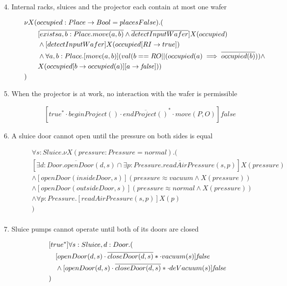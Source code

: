\begin{description}
\cbstart
 \item[4. Internal racks, sluices and the projector each contain at most one wafer]
\begin{align*}
& \nu X(occupied:Place \to Bool=placesFalse).(\\
& \tab\tab [\overline{exists a,b:Place.move(a,b)} \wedge \overline{detectInputWafer}]X(occupied) \\
& \tab\tab \wedge [detectInputWafer]X(occupied[RI \to true]) \\
& \tab\tab \wedge \forall a,b:Place.[move(a,b)](val(b==RO || (occupied(a) \implies \overline{occupied(b)})) \wedge \\
& \tab\tab X(occupied[b \to occupied(a)][a \to \mathit{false}])) \\
& )
\end{align*}
\cbend
 
 \item[5. When the projector is at work, no interaction with the wafer is permissible]
 	\begin{align*}
 		&[true^* \cdot beginProject() \cdot \overline{endProject()}^* \cdot move(P,O)]\mathit{false}
	\end{align*}
	
\cbstart
 \item[6. A sluice door cannot open until the pressure on both sides is equal]
	\begin{align*}
& \forall s: Sluice . \nu X(pressure: Pressure = normal) . ( \\
&   [\overline{\exists d: Door . openDoor(d, s)} \cap \overline{\exists p: Pressure . readAirPressure(s, p)}]X(pressure) \\
&   \wedge [openDoor(insideDoor, s)](pressure \approx vacuum \wedge X(pressure)) \\
&   \wedge [openDoor(outsideDoor, s)](pressure \approx normal \wedge X(pressure)) \\
&   \wedge \forall p: Pressure . [readAirPressure(s, p)]X(p) \\
& ) \\
	\end{align*}
\cbend

 \item[7. Sluice pumps cannot operate until both of its doors are closed]
 
 \begin{align*}
 &[true^*]\forall s:Sluice, d:Door . ( \\
 &\hspace{1em} [openDoor(d,s)\cdot\overline{closeDoor(d,s)}*\cdot vacuum(s)]\mathit{false} \\
 &\hspace{1em} \wedge [openDoor(d,s)\cdot\overline{closeDoor(d,s)}*\cdot deVacuum(s)]\mathit{false} \\
 &)
 \end{align*}


\end{description}
